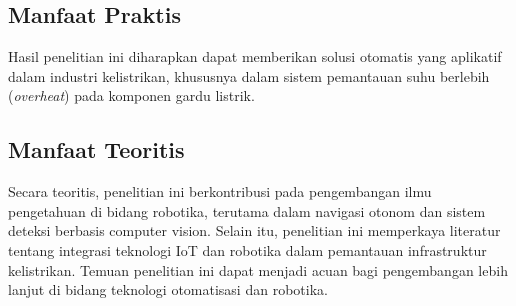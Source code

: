 \subsection{Manfaat Praktis}
Hasil penelitian ini diharapkan dapat memberikan solusi otomatis yang aplikatif dalam industri kelistrikan, khususnya dalam sistem pemantauan suhu berlebih (\emph{overheat}) pada komponen gardu listrik. 

\subsection{Manfaat Teoritis}
Secara teoritis, penelitian ini berkontribusi pada pengembangan ilmu pengetahuan di bidang robotika, terutama dalam navigasi otonom dan sistem deteksi berbasis computer vision. Selain itu, penelitian ini memperkaya literatur tentang integrasi teknologi IoT dan robotika dalam pemantauan infrastruktur kelistrikan. Temuan penelitian ini dapat menjadi acuan bagi pengembangan lebih lanjut di bidang teknologi otomatisasi dan robotika.
